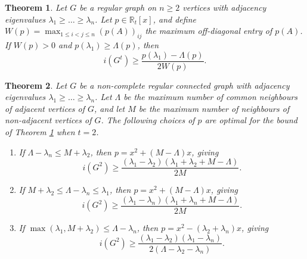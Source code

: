 \documentclass[10pt,a4paper]{amsart}
\newtheorem{theorem}{Theorem}[section]
\theoremstyle{definition}
\def\R{\mathbb R}
\begin{document}
\setcounter{section}{3}
\setcounter{equation}{0}
\setcounter{theorem}{3}
\begin{theorem}\label{theorem:lowerboundi(G^t)}
    Let $G$ be a regular graph on $n\ge 2$ vertices with adjacency eigenvalues $\lambda_1 \ge \dots \ge \lambda_n$. Let $p\in \R_t[x]$, and define $W(p) = \max_{1\le i < j \le n} (p(A))_{ij}$ the maximum off-diagonal entry of $p(A)$. If $W(p)> 0$ and $p(\lambda_1)\ge \Lambda(p)$, then
    $$i(G^t) \ge \frac{p(\lambda_1) - \Lambda(p)}{2W(p)}.$$
\end{theorem}

\setcounter{section}{3}
\setcounter{equation}{0}
\setcounter{theorem}{6}
\begin{theorem}\label{theorem:lowerboundi(G^2)closed}
    Let $G$ be a non-complete regular connected graph with adjacency eigenvalues $\lambda_1\ge \dots \ge \lambda_n$. Let $\Lambda$ be the maximum number of common neighbours of adjacent vertices of $G$, and let $M$ be the maximum number of neighbours of non-adjacent vertices of $G$. The following choices of $p$ are optimal for the bound of Theorem \ref{theorem:lowerboundi(G^t)} when $t=2$.
    \begin{enumerate}
        \item[i.] If $\Lambda-\lambda_n \le M+\lambda_2$, then $p=x^2+(M-\Lambda)x$, giving
        $$i(G^2) \ge \frac{(\lambda_1-\lambda_2)(\lambda_1+\lambda_2+M-\Lambda)}{2M}.$$
        \item[ii.] If $M+\lambda_2 \le \Lambda - \lambda_n \le \lambda_1$, then $p=x^2+(M-\Lambda)x$, giving
        $$i(G^2)\ge \frac{(\lambda_1-\lambda_n)(\lambda_1+\lambda_n+M-\Lambda)}{2M}.$$
        \item[iii.] If $\max(\lambda_1,M+\lambda_2) \le \Lambda-\lambda_n$, then $p=x^2-(\lambda_2+\lambda_n)x$, giving
        $$i(G^2)\ge \frac{(\lambda_1-\lambda_2)(\lambda_1-\lambda_n)}{2(\Lambda-\lambda_2-\lambda_n)}.$$
    \end{enumerate}
\end{theorem}
\end{document}
